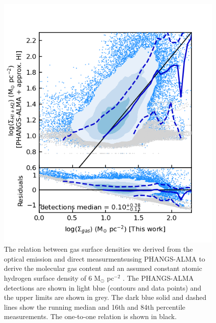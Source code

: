 \documentclass[fleqn,usenatbib]{mnras}
\begin{document}
\begin{figure}
    \centering
    \includegraphics[width=\columnwidth]{figures/fig9.png}
    \caption{The relation between gas surface densities we derived from the optical emission and direct measurmentsusing PHANGS-ALMA to derive the molecular gas content and an assumed constant atomic hydrogen surface density of 6 M$_{\odot}$ pc$^{-2}$ \citep{leroy2021}. The PHANGS-ALMA detections are shown in light blue (contours and data points) and the upper limits are shown in grey. The dark blue solid and dashed lines show the running median and 16th and 84th percentile measurements. The one-to-one relation is shown in black.}
    \label{fig:MUSE_gas_surface_density_comparison_PHANGS_ALMA}
\end{figure}
\end{document}
